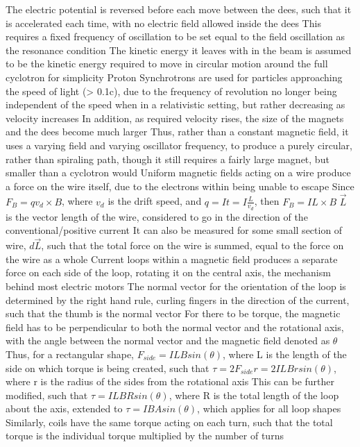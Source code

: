 \documentclass[11 pt, twoside]{article}
\newenvironment{outline*}
{
	\begin{outline}[enumerate]
	}
	{\end{outline}
}
\begin{document}
\begin{outline*}
\3 The electric potential is reversed before each move between the dees, such that it is accelerated each time, with no electric field allowed inside the dees
\3 This requires a fixed frequency of oscillation to be set equal to the field oscillation as the resonance condition
\3 The kinetic energy it leaves with in the beam is assumed to be the kinetic energy required to move in circular motion around the full cyclotron for simplicity
\2 Proton Synchrotrons are used for particles approaching the speed of light (> 0.1c), due to the frequency of revolution no longer being independent of the speed when in a relativistic setting, but rather decreasing as velocity increases
\3 In addition, as required velocity rises, the size of the magnets and the dees become much larger
\3 Thus, rather than a constant magnetic field, it uses a varying field and varying oscillator frequency, to produce a purely circular, rather than spiraling path, though it still requires a fairly large magnet, but smaller than a cyclotron would
\1 Uniform magnetic fields acting on a wire produce a force on the wire itself, due to the electrons within being unable to escape
\2 Since $F_B = qv_d \times B$, where $v_d$ is the drift speed, and $q = It = I\frac{L}{v_d}$, then $F_B = IL\times B$
\3 $\vec{L}$ is the vector length of the wire, considered to go in the direction of the conventional/positive current
\2 It can also be measured for some small section of wire, $d\vec{L}$, such that the total force on the wire is summed, equal to the force on the wire as a whole
\1 Current loops within a magnetic field produces a separate force on each side of the loop, rotating it on the central axis, the mechanism behind most electric motors
\2 The normal vector for the orientation of the loop is determined by the right hand rule, curling fingers in the direction of the current, such that the thumb is the normal vector
\2 For there to be torque, the magnetic field has to be perpendicular to both the normal vector and the rotational axis, with the angle between the normal vector and the magnetic field denoted as $\theta$
\3 Thus, for a rectangular shape, $F_{side} = ILBsin(\theta)$, where L is the length of the side on which torque is being created, such that $\tau = 2F_{side}r = 2ILBrsin(\theta)$, where r is the radius of the sides from the rotational axis
\3 This can be further modified, such that $\tau = ILBRsin(\theta)$, where R is the total length of the loop about the axis, extended to $\tau = IBAsin(\theta)$, which applies for all loop shapes
\2 Similarly, coils have the same torque acting on each turn, such that the total torque is the individual torque multiplied by the number of turns

\end{outline*}
\end{document}
